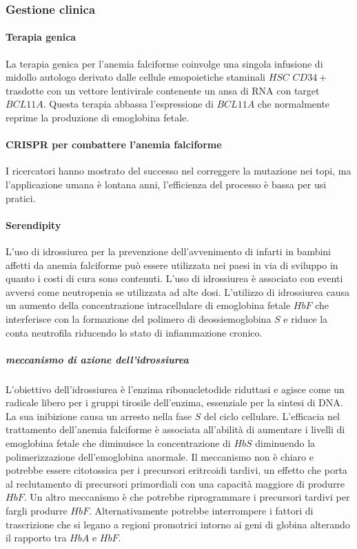 \subsubsection{Gestione clinica}
\paragraph{Terapia genica}
La terapia genica per l'anemia falciforme coinvolge una singola infusione di midollo autologo derivato dalle cellule emopoietiche staminali $HSC$ $CD34+$ trasdotte con un vettore 
lentivirale contenente un ansa di RNA con target $BCL11A$. Questa terapia abbassa l'espressione di $BCL11A$ che normalmente reprime la produzione di emoglobina fetale. 
\paragraph{CRISPR per combattere l'anemia falciforme}
I ricercatori hanno mostrato del successo nel correggere la mutazione nei topi, ma l'applicazione umana \`e lontana anni, l'efficienza del processo \`e bassa per usi pratici. 
\paragraph{Serendipity}
L'uso di idrossiurea per la prevenzione dell'avvenimento di infarti in bambini affetti da anemia falciforme pu\`o essere utilizzata nei paesi in via di sviluppo in quanto i costi di cura
sono contenuti. L'uso di idrossiurea \`e associato con eventi avversi come neutropenia se utilizzata ad alte dosi. L'utilizzo di idrossiurea causa un aumento della concentrazione 
intracellulare di emoglobina fetale $HbF$ che interferisce con la formazione del polimero di deossiemoglobina $S$ e riduce la conta neutrofila riducendo lo stato di infiammazione 
cronico.
\subparagraph{meccanismo di azione dell'idrossiurea}
L'obiettivo dell'idrossiurea \`e l'enzima ribonucletodide riduttasi e agisce come un radicale libero per i gruppi tirosile dell'enzima, essenziale per la sintesi di DNA. La sua 
inibizione causa un arresto nella fase $S$ del ciclo cellulare. L'efficacia nel trattamento dell'anemia falciforme \`e associata all'abilit\`a di aumentare i livelli di emoglobina
fetale che diminuisce la concentrazione di $HbS$ diminuendo la polimerizzazione dell'emoglobina anormale. Il meccanismo non \`e chiaro e potrebbe essere citotossica per i precursori 
eritrcoidi tardivi, un effetto che porta al reclutamento di precursori primordiali con una capacit\`a maggiore di produrre $HbF$. Un altro meccanismo \`e che potrebbe riprogrammare i 
precursori tardivi per fargli produrre $HbF$. Alternativamente potrebbe interrompere i fattori di trascrizione che si legano a regioni promotrici intorno ai geni di globina alterando
il rapporto tra $HbA$ e $HbF$. 
